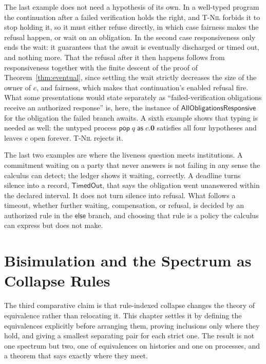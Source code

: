 \documentclass[11pt,openany]{book}
\theoremstyle{remark}
\begin{document}
The last example does not need a hypothesis of its own. In a well-typed
program the continuation after a failed verification holds the right, and
\textsc{T-Nil} forbids it to stop holding it, so it must either refuse
directly, in which case fairness makes the refusal happen, or wait on an
obligation. In the second case responsiveness only ends the wait: it
guarantees that the await is eventually discharged or timed out, and
nothing more. That the refusal after it then happens follows from
responsiveness together with the finite descent of the proof of
Theorem~\ref{thm:eventual}, since settling the wait strictly decreases
the size of the owner of $c$, and fairness, which makes that
continuation's enabled refusal fire. What some presentations
would state separately as ``failed-verification obligations receive an
authorized response'' is, here, the instance of
$\mathsf{AllObligationsResponsive}$ for the obligation the failed branch
awaits.
A sixth example shows that typing is needed as well: the untyped process
$\mathsf{pop}\;q\;\mathsf{as}\;c.\mathbf 0$ satisfies all four hypotheses
and leaves $c$ open forever. \textsc{T-Nil} rejects it.

The last two examples are where the liveness question meets institutions.
A commitment waiting on a party that never answers is not failing in any
sense the calculus can detect; the ledger shows it waiting, correctly. A
deadline turns silence into a record, $\mathsf{TimedOut}$, that says the
obligation went unanswered within the declared interval. It does not turn
silence into refusal. What follows a timeout, whether further waiting,
compensation, or refusal, is decided by an authorized rule in the
$\mathsf{else}$ branch, and choosing that rule is a policy the calculus
can express but does not make.


\chapter{Bisimulation and the Spectrum as Collapse Rules}
\label{ch:spectrum}

The third comparative claim is that rule-indexed collapse changes the
theory of equivalence rather than relocating it. This chapter settles it
by defining the equivalences explicitly before arranging them, proving
inclusions only where they hold, and giving a smallest separating pair
for each strict one. The result is not one spectrum but two, one of
equivalences on histories and one on processes, and a theorem that says
exactly where they meet.
\end{document}
